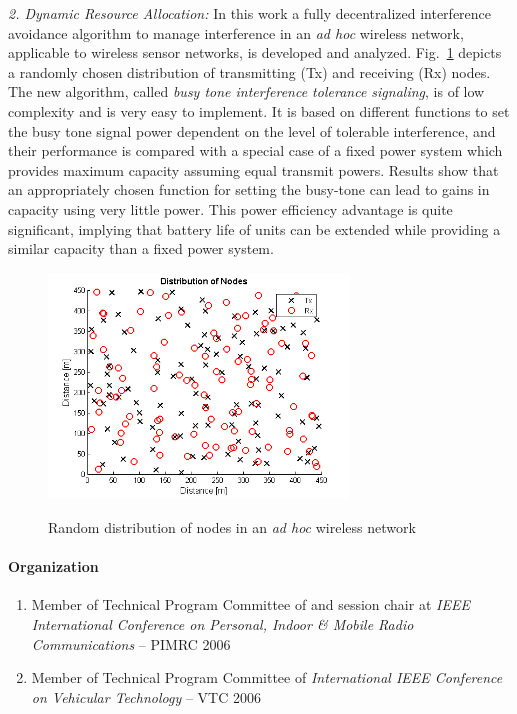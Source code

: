 \emph{2. Dynamic Resource Allocation:}
In this work a fully decentralized interference avoidance algorithm to
manage interference in an \emph{ad hoc} wireless network, applicable
to wireless sensor networks, is developed and analyzed. Fig.~\ref{dca}
depicts a randomly chosen distribution of transmitting (Tx) and
receiving (Rx) nodes. The new algorithm, called \emph{busy tone
interference tolerance signaling}, is of low complexity and is very
easy to implement. It is based on different functions to set the busy tone
signal power dependent on the level of tolerable interference, and
their performance is compared with a special case of a fixed power
system which provides maximum capacity assuming equal transmit
powers. Results show that an appropriately chosen function for setting
the busy-tone can lead to gains in capacity using very little
power. This power efficiency advantage is quite significant, implying
that battery life of units can be extended while providing a similar
capacity than a fixed power system.
\begin{figure}[!!htp]
 \centering
\includegraphics[width=8cm]{haas_3.png}\\
\caption{Random distribution of nodes in an \emph{ad hoc} wireless network}
\label{dca}
\end{figure}


\paragraph{Organization}
\begin{enumerate}
    \item Member of Technical Program Committee of and session chair
          at \emph{IEEE International Conference on Personal, Indoor \& Mobile Radio Communications} -- PIMRC 2006
    \item Member of Technical Program Committee of \emph{International IEEE Conference on Vehicular Technology} -- VTC 2006
\end{enumerate}


